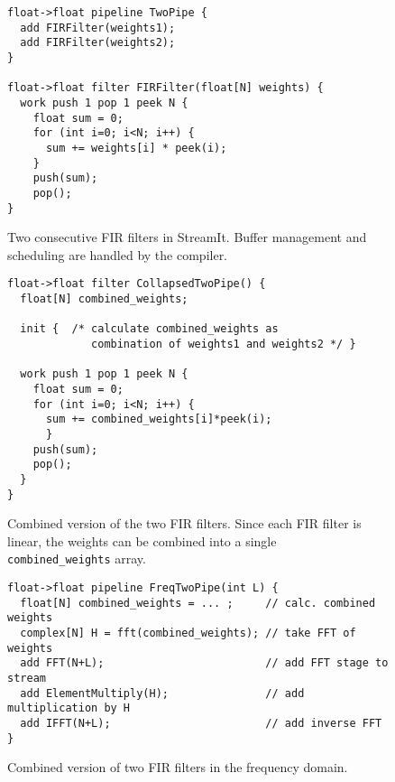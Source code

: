 \begin{figure}[t]
\vspace{-6pt}
\scriptsize
\begin{verbatim}
float->float pipeline TwoPipe {
  add FIRFilter(weights1);
  add FIRFilter(weights2);
}

float->float filter FIRFilter(float[N] weights) {
  work push 1 pop 1 peek N {
    float sum = 0;
    for (int i=0; i<N; i++) {
      sum += weights[i] * peek(i);
    }
    push(sum);
    pop();
}
\end{verbatim}
\vspace{-18pt}
\caption{Two consecutive FIR filters in StreamIt.  Buffer management
and scheduling are handled by the compiler.\protect\label{fig:example-streamit}}
\begin{verbatim}
float->float filter CollapsedTwoPipe() {
  float[N] combined_weights;

  init {  /* calculate combined_weights as 
             combination of weights1 and weights2 */ }

  work push 1 pop 1 peek N {
    float sum = 0;
    for (int i=0; i<N; i++) {
      sum += combined_weights[i]*peek(i);
      }
    push(sum);
    pop();
  }
}
\end{verbatim}
\vspace{-18pt}
\caption{Combined version of the two FIR filters.  Since each FIR
filter is linear, the weights can be combined into a single {\tt
combined\_weights} array.\protect\label{fig:example-combine}}
\begin{verbatim}
float->float pipeline FreqTwoPipe(int L) {
  float[N] combined_weights = ... ;     // calc. combined weights 
  complex[N] H = fft(combined_weights); // take FFT of weights     
  add FFT(N+L);                         // add FFT stage to stream 
  add ElementMultiply(H);               // add multiplication by H 
  add IFFT(N+L);                        // add inverse FFT         
}
\end{verbatim}
\vspace{-18pt}
\caption{Combined version of two FIR filters in the frequency domain.
\protect\label{fig:example-frequency}}
\vspace{-20pt}
\end{figure}


